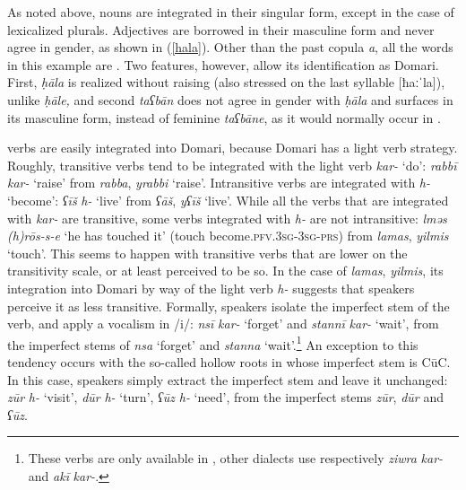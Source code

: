 \documentclass[output=paper]{langsci/langscibook}
\begin{document}
As noted above,  nouns are integrated in their singular form, except in the case of lexicalized plurals. Adjectives are borrowed in their masculine form and never agree in {gender}, as shown in (\ref{hala}). Other than the past {copula} \textit{a}, all the words in this example are . Two features, however, allow its identification as Domari. First, \textit{ḥāla} is realized without raising (also stressed on the last syllable [ħaːˈla]), unlike   \textit{ḥāle,} and second \textit{taʕbān} does not agree in {gender} with \textit{ḥāla} and surfaces in its masculine form, instead of feminine \textit{taʕbāne}, as it would normally occur in .


 verbs are easily integrated into Domari, because Domari has a {light verb} strategy. Roughly, transitive verbs tend to be integrated with the {light verb} \textit{kar-} ‘do’: \textit{rabbī} \textit{kar-} ‘raise’ from  \textit{rabba}, \textit{yrabbi} ‘raise’. Intransitive verbs are integrated with \textit{h-} ‘become’: \textit{ʕīš} \textit{h-} ‘live’ from  \textit{ʕāš}, \textit{yʕīš} ‘live’. While all the verbs that are integrated with \textit{kar-} are transitive, some verbs integrated with \textit{h-} are not intransitive: \textit{lməs} \textit{(h)rōs-s-e} ‘he has touched it’ (touch become.\textsc{pfv.3sg-3sg-prs}) from  \textit{lamas}, \textit{yilmis} ‘touch’. This seems to happen with transitive verbs that are lower on the transitivity scale, or at least perceived to be so. In the case of \textit{lamas}, \textit{yilmis}, its integration into Domari by way of the {light verb} \textit{h-} suggests that speakers perceive it as less transitive. Formally, speakers isolate the imperfect {stem} of the verb, and apply a vocalism in /i/: \textit{nsī} \textit{kar-} ‘forget’ and \textit{stannī} \textit{kar-} ‘wait’, from the  imperfect stems of \textit{nsa} ‘forget’ and \textit{stanna} ‘wait’.\footnote{These verbs are only available in , other dialects use respectively \textit{ziwra} \textit{kar-} and \textit{akī} \textit{kar-}.} An exception to this tendency occurs with the so-called hollow {roots} in  whose imperfect {stem} is CūC. In this case, speakers simply extract the imperfect {stem} and leave it unchanged: \textit{zūr} \textit{h-} ‘visit’, \textit{dūr} \textit{h-} ‘turn’, \textit{ʕūz} \textit{h-} ‘need’, from the  imperfect stems \textit{zūr}, \textit{dūr} and \textit{ʕūz}.
\end{document}
